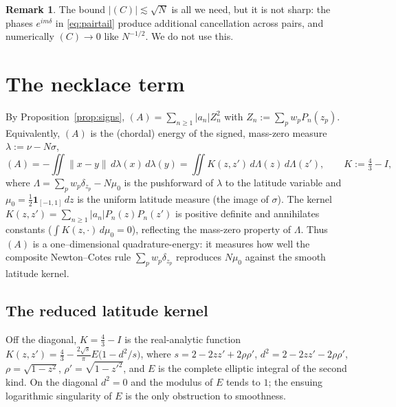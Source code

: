 \documentclass[11pt,reqno]{amsart}
\theoremstyle{definition}
\newtheorem{remark}[theorem]{Remark}
\newcommand{\Leg}{P}                      %
\newcommand{\dist}[2]{\lVert #1-#2\rVert}
\newcommand{\abs}[1]{\lvert #1\rvert}
\newcommand{\rp}{\rho}
\newcommand{\lesss}{\lesssim}
\begin{document}
\begin{remark}
The bound $\abs{(C)}\lesss\sqrt N$ is all we need, but it is not sharp: the phases $e^{im\delta}$ in
\eqref{eq:pairtail} produce additional cancellation across pairs, and numerically $(C)\to0$ like
$N^{-1/2}$. We do not use this.
\end{remark}

\section{The necklace term}\label{sec:necklace}

By Proposition~\ref{prop:signs}, $(A)=\sum_{n\ge1}\abs{a_n}Z_n^2$ with
$Z_n:=\sum_p w_p\Leg_n(z_p)$. Equivalently, $(A)$ is the (chordal) energy of the signed, mass-zero
measure $\lambda:=\nu-N\sigma$,
\begin{equation}\label{eq:Aenergy}
   (A)=-\iint\dist{x}{y}\,d\lambda(x)\,d\lambda(y)
      =\iint K(z,z')\,d\Lambda(z)\,d\Lambda(z'),\qquad K:=\tfrac43-I,
\end{equation}
where $\Lambda=\sum_p w_p\delta_{z_p}-N\mu_0$ is the pushforward of $\lambda$ to the latitude
variable and $\mu_0=\frac12\mathbf 1_{[-1,1]}\,dz$ is the uniform latitude measure (the image of
$\sigma$). The kernel $K(z,z')=\sum_{n\ge1}\abs{a_n}\Leg_n(z)\Leg_n(z')$ is positive definite and
annihilates constants ($\int K(z,\cdot)\,d\mu_0=0$), reflecting the mass-zero property of $\Lambda$.
Thus $(A)$ is a one--dimensional quadrature-energy: it measures how well the composite
Newton--Cotes rule $\sum_p w_p\delta_{z_p}$ reproduces $N\mu_0$ against the smooth latitude kernel.

\subsection{The reduced latitude kernel}
Off the diagonal, $K=\tfrac43-I$ is the real-analytic function
$K(z,z')=\tfrac43-\tfrac{2\sqrt{s}}{\pi}E\!\bigl(1-d^2/s\bigr)$, where
$s=2-2zz'+2\rp\rp'$, $d^2=2-2zz'-2\rp\rp'$, $\rp=\sqrt{1-z^2}$, $\rp'=\sqrt{1-z'^2}$, and $E$ is the
complete elliptic integral of the second kind. On the diagonal $d^2=0$ and the modulus of $E$ tends to
$1$; the ensuing logarithmic singularity of $E$ is the only obstruction to smoothness.
\end{document}
